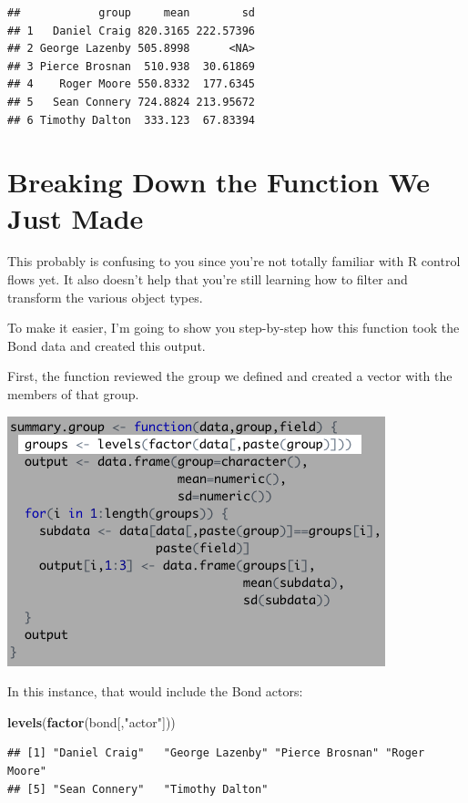 \documentclass[
]{book}
\newenvironment{Shaded}{\begin{snugshade}}{\end{snugshade}}
\newcommand{\KeywordTok}[1]{\textcolor[rgb]{0.13,0.29,0.53}{\textbf{#1}}}
\newcommand{\NormalTok}[1]{#1}
\newcommand{\StringTok}[1]{\textcolor[rgb]{0.31,0.60,0.02}{#1}}
\begin{document}
\begin{center}
\begin{verbatim}
##            group     mean        sd
## 1   Daniel Craig 820.3165 222.57396
## 2 George Lazenby 505.8998      <NA>
## 3 Pierce Brosnan  510.938  30.61869
## 4    Roger Moore 550.8332  177.6345
## 5   Sean Connery 724.8824 213.95672
## 6 Timothy Dalton  333.123  67.83394
\end{verbatim}

\hypertarget{breaking-down-the-function-we-just-made}{%
\section{Breaking Down the Function We Just Made}\label{breaking-down-the-function-we-just-made}}

This probably is confusing to you since you're not totally familiar with R control flows yet. It also doesn't help that you're still learning how to filter and transform the various object types.

To make it easier, I'm going to show you step-by-step how this function took the Bond data and created this output.

First, the function reviewed the group we defined and created a vector with the members of that group.

\begin{center}\includegraphics[width=0.5\linewidth]{1.52_Function_Breakdown} \end{center}

In this instance, that would include the Bond actors:

\begin{Shaded}
\begin{Highlighting}[]
\KeywordTok{levels}\NormalTok{(}\KeywordTok{factor}\NormalTok{(bond[,}\StringTok{"actor"}\NormalTok{]))}
\end{Highlighting}
\end{Shaded}

\begin{verbatim}
## [1] "Daniel Craig"   "George Lazenby" "Pierce Brosnan" "Roger Moore"   
## [5] "Sean Connery"   "Timothy Dalton"
\end{verbatim}


\end{center}
\end{document}
